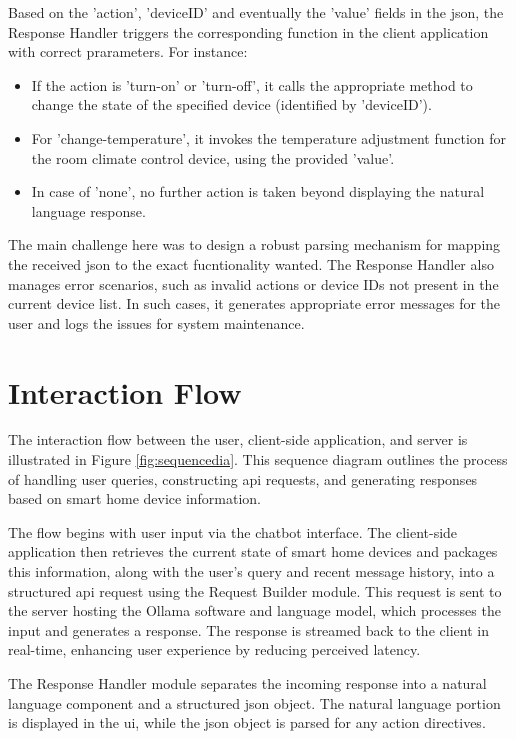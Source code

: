 Based on the 'action', 'deviceID' and eventually the 'value' fields in the \gls{json}, the Response Handler triggers the corresponding function in the client application with correct prarameters. For instance:

\begin{itemize}
\item If the action is 'turn-on' or 'turn-off', it calls the appropriate method to change the state of the specified device (identified by 'deviceID').
\item For 'change-temperature', it invokes the temperature adjustment function for the room climate control device, using the provided 'value'.
\item In case of 'none', no further action is taken beyond displaying the natural language response.
\end{itemize}

The main challenge here was to design a robust parsing mechanism for mapping the received \gls{json} to the exact fucntionality wanted.
The Response Handler also manages error scenarios, such as invalid actions or device IDs not present in the current device list. In such cases, it generates appropriate error messages for the user and logs the issues for system maintenance.

\section{Interaction Flow}
The interaction flow between the user, client-side application, and server is illustrated in Figure \ref{fig:sequencedia}. This sequence diagram outlines the process of handling user queries, constructing \gls{api} requests, and generating responses based on smart home device information.

The flow begins with user input via the chatbot interface. The client-side application then retrieves the current state of smart home devices and packages this information, along with the user's query and recent message history, into a structured \gls{api} request using the Request Builder module.
This request is sent to the server hosting the Ollama software and language model, which processes the input and generates a response. The response is streamed back to the client in real-time, enhancing user experience by reducing perceived latency.

The Response Handler module separates the incoming response into a natural language component and a structured \gls{json} object. The natural language portion is displayed in the \gls{ui}, while the \gls{json} object is parsed for any action directives.

